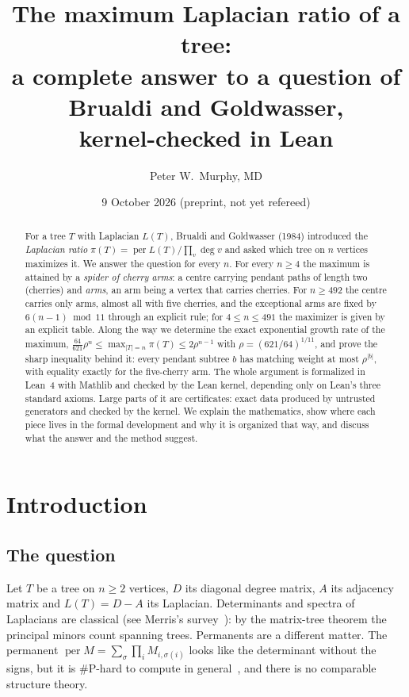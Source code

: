 \documentclass[11pt]{article}
\title{The maximum Laplacian ratio of a tree:\\
a complete answer to a question of Brualdi and Goldwasser,\\
kernel-checked in Lean}
\author{Peter W.\ Murphy, MD}
\date{9 October 2026 \quad (preprint, not yet refereed)}
\theoremstyle{definition}
\newcommand{\per}{\operatorname{per}}
\renewcommand{\deg}{\operatorname{deg}}
\begin{document}
\maketitle

\begin{abstract}
For a tree $T$ with Laplacian $L(T)$, Brualdi and Goldwasser (1984) introduced the
\emph{Laplacian ratio} $\pi(T)=\per L(T)/\prod_v\deg v$ and asked which tree on $n$ vertices
maximizes it. We answer the question for every $n$. For every $n\ge 4$ the maximum is attained by a
\emph{spider of cherry arms}: a centre carrying pendant paths of length two (cherries) and
\emph{arms}, an arm being a vertex that carries cherries. For $n\ge 492$ the centre carries only arms,
almost all with five cherries, and the exceptional arms are fixed by $6(n-1)\bmod 11$ through an explicit
rule; for $4\le n\le 491$ the maximizer is given by an explicit table. Along the way we determine the
exact exponential growth rate of the maximum,
$\tfrac{64}{621}\rho^{n}\le\max_{|T|=n}\pi(T)\le 2\rho^{n-1}$ with $\rho=(621/64)^{1/11}$, and prove the
sharp inequality behind it: every pendant subtree $b$ has matching weight at most $\rho^{|b|}$, with
equality exactly for the five-cherry arm. The whole argument is formalized in Lean~4 with Mathlib and
checked by the Lean kernel, depending only on Lean's three standard axioms. Large parts of it are
certificates: exact data produced by untrusted generators and checked by the kernel. We explain the
mathematics, show where each piece lives in the formal development and why it is organized that way,
and discuss what the answer and the method suggest.
\end{abstract}

\tableofcontents
\bigskip

\section{Introduction}

\subsection{The question}

Let $T$ be a tree on $n\ge2$ vertices, $D$ its diagonal degree matrix, $A$ its adjacency matrix and
$L(T)=D-A$ its Laplacian. Determinants and spectra of Laplacians are classical (see
Merris's survey~\cite{Merris1994}): by the matrix-tree theorem the principal minors count spanning trees. Permanents are a different matter. The permanent
$\per M=\sum_{\sigma}\prod_iM_{i,\sigma(i)}$ looks like the determinant without the signs, but it is
\#P-hard to compute in general~\cite{Valiant1979}, and there is no comparable structure theory.
\end{document}

